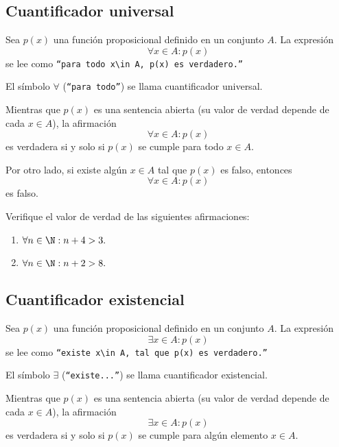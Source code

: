 \subsection{Cuantificador universal}


 Sea $p(x)$ una función proposicional definido en un conjunto $A.$ La expresión
 \begin{equation}
 \label{lip:4.1}
   \forall x \in A: p(x)
 \end{equation} 
 se lee como  \texttt{``para todo $x\in A,$ $p(x)$ es verdadero.''}  
 
 El símbolo $\forall$ (\texttt{``para todo''}) se llama cuantificador universal.




 Mientras que $p(x)$ es una sentencia abierta (su valor de verdad depende de cada $x\in A$), la afirmación 
 $$\forall x\in A: p(x)$$ es verdadera si y solo si $p(x)$ se cumple para todo $x\in A.$  



 Por otro lado, si existe algún $x\in A$ tal que $p(x)$ es falso, entonces $$\forall x\in A: p(x)$$ es falso.



 \begin{problema}
  \label{lip:exmp:4.8}
  Verifique el valor de verdad de las siguientes afirmaciones:
  \begin{enumerate}
   \item $\forall n \in \N: n+4>3.$ 
   \item $\forall n \in \N: n+2>8.$
  \end{enumerate}

 \end{problema}



\subsection{Cuantificador existencial}


 Sea $p(x)$ una función proposicional definido en un conjunto $A.$ La expresión
 \begin{equation}
 \label{lip:4.3}
   \exists x \in A: p(x)
 \end{equation} 
 se lee como  \texttt{``existe $x\in A,$ tal que $p(x)$ es verdadero.''}  
 
 El símbolo $\exists$ (\texttt{``existe...''}) se llama cuantificador existencial.




 Mientras que $p(x)$ es una sentencia abierta (su valor de verdad depende de cada $x\in A$), la afirmación 
 $$\exists x\in A: p(x)$$ es verdadera si y solo si $p(x)$ se cumple para algún elemento $x\in A.$  



